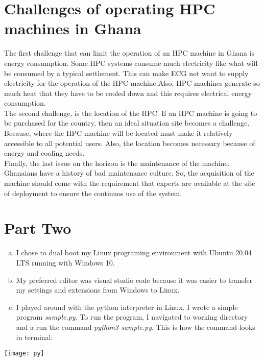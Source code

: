 \documentclass[12pt, a4paper, fleqn, titlepage]{article}
\begin{document}
    

\section{Challenges of operating HPC machines in Ghana}
    
        The first challenge that can limit the operation of an HPC machine in Ghana is energy consumption. Some HPC systems consume much electricity like what will be consumed by a typical settlement. This can make ECG not want to supply electricity for the operation of the HPC machine.Also, HPC machines generate so much heat that they have to be cooled down and this requires electrical energy consumption.\\
        The second challenge, is the location of the HPC. If an HPC machine is going to be purchased for the country, then an ideal situation site becomes a challenge. Because, where the HPC machine will be located must make it relatively accessible to all potential users. Also, the location becomes necessary because of energy and cooling needs.\\
        Finally, the last issue on the horizon is the maintenance of the machine. Ghanaians have a history of bad maintenance culture. So, the acquisition of the machine should come with the requirement that experts are available at the site of deployment to ensure the continuos use of the system.
    

\section{Part Two}
    \begin{enumerate}[a.]
        \item I chose to dual boot my Linux programing environment with Ubuntu 20.04 LTS running with Windows 10.
        \item My preferred editor was visual studio code because it was easier to transfer my settings and extensions from Windows to Linux.
        \item I played around with the python interpreter in Linux. I wrote a simple program \emph{sample.py}. To run the program, I navigated to working directory and a run the command \emph{python3 sample.py}. This is how the command looks in terminal:
    \end{enumerate}

    \begin{center}
        \texttt{[image: py]}
    \end{center}
        
\end{document}
